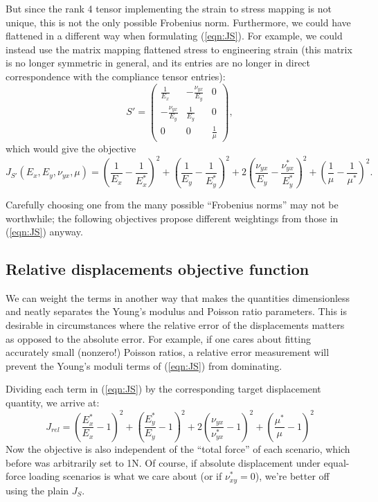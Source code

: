 \documentclass[10pt]{article}
\begin{document}
But since the rank 4 tensor implementing the strain to stress mapping is not
unique, this is not the only possible Frobenius norm. Furthermore, we could have
flattened in a different way when formulating (\ref{eqn:JS}). For example, we
could instead use the matrix mapping flattened stress to engineering strain
(this matrix is no longer symmetric in general, and its entries are no longer in
direct correspondence with the compliance tensor entries):
$$
S' = \begin{pmatrix}
    \frac{1}{E_x} & -\frac{\nu_{yx}}{E_y} & 0 \\
    -\frac{\nu_{yx}}{E_y} & \frac{1}{E_y}  & 0 \\
    0 & 0 & \frac{1}{\mu}
\end{pmatrix},
$$
which would give the objective
\begin{equation}
    \label{eqn:JS'}
J_{S'}(E_x, E_y, \nu_{yx}, \mu) = 
\left(\frac{1}{E_x} - \frac{1}{E_x^*}\right)^2 +
\left(\frac{1}{E_y} - \frac{1}{E_y^*}\right)^2 +
2 \left(\frac{\nu_{yx}}{E_y} - \frac{\nu_{yx}^*}{E_y^*}\right)^2 +
\left(\frac{1}{\mu} - \frac{1}{\mu^*}\right)^2.
\end{equation}

Carefully choosing one from the many possible ``Frobenius norms'' may not be
worthwhile; the following objectives propose different weightings from those in
(\ref{eqn:JS}) anyway.

\subsection{Relative displacements objective function}
We can weight the terms in another way that makes the quantities dimensionless
and neatly separates the Young's modulus and Poisson ratio parameters. This is
desirable in circumstances where the relative error of the displacements matters
as opposed to the absolute error. For example, if one cares about fitting
accurately small (nonzero!) Poisson ratios, a relative error measurement will
prevent the Young's moduli terms of (\ref{eqn:JS}) from dominating.

Dividing each term in (\ref{eqn:JS}) by the corresponding target displacement
quantity, we arrive at:
$$
J_{rel} = \left(\frac{E_x^*}{E_x} - 1 \right)^2 + \left(\frac{E_y^*}{E_y} - 1 \right)^2
    + 2 \left(\frac{\nu_{yx}}{\nu_{yx}^*} - 1 \right)^2
    + \left(\frac{\mu^*}{\mu} - 1 \right)^2
$$
Now the objective is also independent of the ``total force'' of each scenario,
which before was arbitrarily set to 1N.
Of course, if absolute displacement under equal-force loading scenarios is what we
care about (or if $\nu_{xy}^* = 0$), we're better off using the plain $J_S$.
\end{document}

